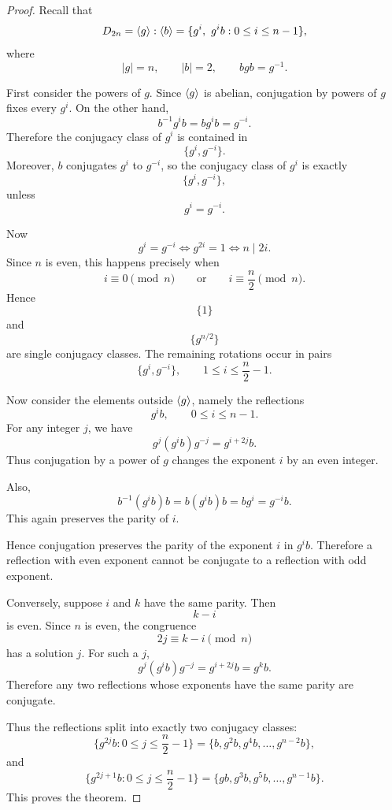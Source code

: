     \begin{proof}
    Recall that
    \[
        D_{2n}
        =
        \langle g\rangle:\langle b\rangle
        =
        \{g^i,\ g^i b:0\leq i\leq n-1\},
    \]
    where
    \[
        |g|=n,
        \qquad
        |b|=2,
        \qquad
        bgb=g^{-1}.
    \]
    
    First consider the powers of $g$. Since $\langle g\rangle$ is abelian, conjugation by powers of $g$ fixes every $g^i$. On the other hand,
    \[
        b^{-1}g^i b
        =
        bg^i b
        =
        g^{-i}.
    \]
    Therefore the conjugacy class of $g^i$ is contained in
    \[
        \{g^i,g^{-i}\}.
    \]
    Moreover, $b$ conjugates $g^i$ to $g^{-i}$, so the conjugacy class of $g^i$ is exactly
    \[
        \{g^i,g^{-i}\},
    \]
    unless
    \[
        g^i=g^{-i}.
    \]
    
    Now
    \[
        g^i=g^{-i}
        \iff
        g^{2i}=1
        \iff
        n\mid 2i.
    \]
    Since $n$ is even, this happens precisely when
    \[
        i\equiv 0\pmod n
        \qquad\text{or}\qquad
        i\equiv \frac n2\pmod n.
    \]
    Hence
    \[
        \{1\}
    \]
    and
    \[
        \{g^{n/2}\}
    \]
    are single conjugacy classes. The remaining rotations occur in pairs
    \[
        \{g^i,g^{-i}\},
        \qquad
        1\leq i\leq \frac n2-1.
    \]
    
    Now consider the elements outside $\langle g\rangle$, namely the reflections
    \[
        g^i b,
        \qquad
        0\leq i\leq n-1.
    \]
    For any integer $j$, we have
    \[
        g^j(g^i b)g^{-j}
        =
        g^{i+2j}b.
    \]
    Thus conjugation by a power of $g$ changes the exponent $i$ by an even integer.
    
    Also,
    \[
        b^{-1}(g^i b)b
        =
        b(g^i b)b
        =
        bg^i
        =
        g^{-i}b.
    \]
    This again preserves the parity of $i$.
    
    Hence conjugation preserves the parity of the exponent $i$ in $g^i b$. Therefore a reflection with even exponent cannot be conjugate to a reflection with odd exponent.
    
    Conversely, suppose $i$ and $k$ have the same parity. Then
    \[
        k-i
    \]
    is even. Since $n$ is even, the congruence
    \[
        2j\equiv k-i\pmod n
    \]
    has a solution $j$. For such a $j$,
    \[
        g^j(g^i b)g^{-j}
        =
        g^{i+2j}b
        =
        g^k b.
    \]
    Therefore any two reflections whose exponents have the same parity are conjugate.
    
    Thus the reflections split into exactly two conjugacy classes:
    \[
        \{g^{2j}b:0\leq j\leq \frac n2-1\}
        =
        \{b,g^2b,g^4b,\ldots,g^{n-2}b\},
    \]
    and
    \[
        \{g^{2j+1}b:0\leq j\leq \frac n2-1\}
        =
        \{gb,g^3b,g^5b,\ldots,g^{n-1}b\}.
    \]
    This proves the theorem.
    \end{proof}
    
